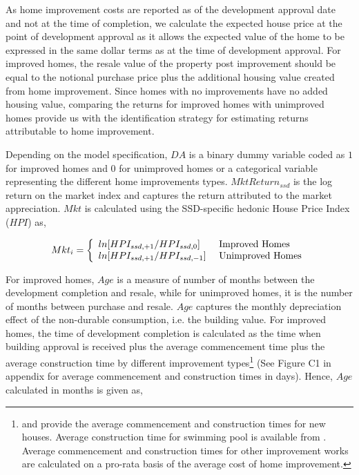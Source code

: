 \documentclass[AEJ,reqno, draftmode]{AEA} %
\begin{document}
As home improvement costs are reported as of the development approval date and not at the time of completion, we calculate the expected house price at the point of development approval as it allows the expected value of the home to be expressed in the same dollar terms as at the time of development approval. For improved homes, the resale value of the property post improvement should be equal to the notional purchase price plus the additional housing value created from home improvement. Since homes with no improvements have no added housing value, comparing the returns for improved homes with unimproved homes provide us with the identification strategy for estimating returns attributable to home improvement. 

Depending on the model specification, $DA$ is a binary dummy variable coded as $1$ for improved homes and $0$ for unimproved homes or a categorical variable representing the different home improvements types. $MktReturn_{ssd}$ is the log return on the market index and captures the return attributed to the market appreciation. $Mkt$ is calculated using the SSD-specific hedonic House Price Index ($HPI$) as,

\begin{equation}
    Mkt_i = \left\{
    \begin{array}{l l}
      ln[HPI_{ssd,+1}/HPI_{ssd,0}] & \text{ Improved Homes}\\
      ln[HPI_{ssd,+1}/HPI_{ssd,-1}] & \text{ Unimproved Homes} \\
    \end{array} \right.
\end{equation}

For improved homes, $Age$ is a measure of number of months between the development completion and resale, while for unimproved homes, it is the number of months between purchase and resale. $Age$ captures the monthly depreciation effect of the non-durable consumption, i.e. the building value. For improved homes, the time of development completion is calculated as the time when building approval is received plus the average commencement time plus the average construction time by different improvement types\footnote{\citet{abs_house_times_commence} and \citet{abs_house_times} provide the average commencement and construction times for new houses. Average construction time for swimming pool is available from \citep{hi_swimming_time}. Average commencement and construction times for other improvement works are calculated on a pro-rata basis of the average cost of home improvement.} (See Figure C1 in appendix for average commencement and construction times in days). Hence, $Age$ calculated in months is given as, 
\end{document}
